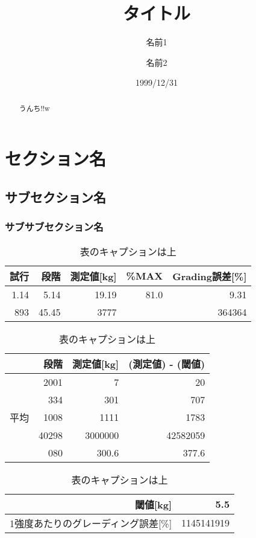 \documentclass[dvipdfmx]{jsarticle}
\title{\vspace{-10mm}タイトル}
\author {名前1 \and 名前2}
\date {1999/12/31}
\begin{document}
    \maketitle

    \vspace{-15mm}
    \begin{abstract}
        うんち!!w
        \vspace{3mm}
    \end{abstract}

    \vspace{1mm}

    \section{セクション名}\label{seq:s1}
    \subsection{サブセクション名}
    \subsubsection{サブサブセクション名}
    \begin{table}[H]%
        \begin{flushleft}
            \caption{表のキャプションは上\label{tb:t1}}
            \begin{tabular}{|r|r|r|r|r|}  \hline
            試行 & 段階 & 測定値[kg] & \%MAX & Grading誤差[\%] \\ \hline \hline
            1.14 & 5.14 & 19.19 & 81.0 & 9.31 \\ \hline
            893 & 45.45 & 3777 &  & 364364 \\ \hline
            \end{tabular}
            \begin{tabular}{|r|r|r|r|} \hline \hline
            & 段階 & 測定値[kg] & (測定値) - (閾値) \\ \hline \hline
            & 2001 & 7 & 20 \\ \cline{2-4}
            & 334 & 301 & 707 \\ \cline{2-4}
            平均 & 1008 & 1111 & 1783 \\ \cline{2-4}
            & 40298 & 3000000 & 42582059 \\ \cline{2-4}
            & 080 & 300.6 & 377.6 \\ \hline
            \end{tabular}
            \begin{tabular}{|r|r|} \hline \hline
            閾値[kg] & 5.5 \\ \hline \hline
            1強度あたりのグレーディング誤差[\%] & 1145141919 \\ \hline
            \end{tabular}
        \end{flushleft}
    \end{table}
\end{document}
